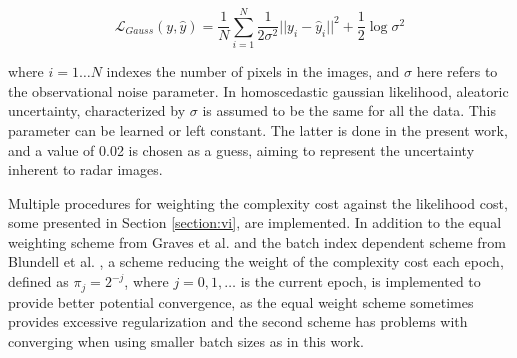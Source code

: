 \begin{equation}
	\mathcal{L}_{Gauss}(y, \hat{y}) = \frac{1}{N} \sum_{i=1}^{N} \frac{1}{2\sigma^2}||y_i - \hat{y}_i||^2 
	+ \frac{1}{2} \log \sigma^2
\end{equation}

where $i = 1 \dots N$ indexes the number of pixels in the images, and $\sigma$ here refers to the observational noise parameter. In homoscedastic gaussian likelihood, aleatoric uncertainty, characterized by $\sigma$ is assumed to be the same for all the data. This parameter can be learned or left constant. The latter is done in the present work, and a value of 0.02 is chosen as a guess, aiming to represent the uncertainty inherent to radar images. 

Multiple procedures for weighting the complexity cost against the likelihood cost, some presented in Section \ref{section:vi}, are implemented. In addition to the equal weighting scheme from Graves et al. \cite{graves_practical_2011} and the batch index dependent scheme from Blundell et al. \cite{blundell_weight_2015}, a scheme reducing the weight of the complexity cost each epoch, defined as $\pi_j = 2^{-j}$, where $j=0,1,\dots$ is the current epoch, is implemented to provide better potential convergence, as the equal weight scheme sometimes provides excessive regularization and the second scheme has problems with converging when using smaller batch sizes as in this work.


